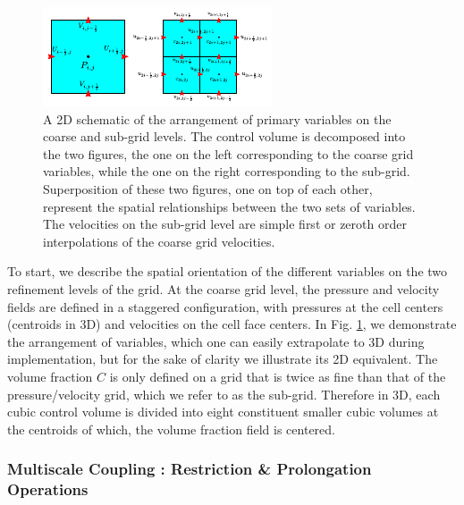 \begin{figure}[h!]
\includegraphics[width = \textwidth]{plots/sub_grid.pdf} 
\centering
\caption{A 2D schematic of the arrangement of primary variables 
on the coarse and sub-grid levels. 
The control volume is decomposed into the two figures, the one
on the left corresponding to the coarse grid variables, while the 
one on the right corresponding to the sub-grid. 
Superposition of these two figures, one on top of each other,
represent the spatial relationships between the two sets of variables.
The velocities on the sub-grid level are simple first 
or zeroth order interpolations of the coarse grid velocities.
}
\label{sub_grid}
\end{figure}

To start, we describe the spatial orientation of the different 
variables on the two refinement levels of the grid.   
At the coarse grid level, the pressure and velocity fields are 
defined in a staggered configuration, with pressures at the cell 
centers (centroids in 3D) and velocities on the cell face centers. 
In Fig. \ref{sub_grid}, we demonstrate the arrangement of variables, 
which one can easily extrapolate to 3D during implementation, 
but for the sake of clarity we illustrate its 2D equivalent. 
The volume fraction $C$ 
 is only defined on a grid that is twice as fine than 
that of the pressure/velocity grid, which we refer to as the sub-grid. 
Therefore in 3D, each cubic control volume is divided into eight constituent 
smaller cubic volumes at the centroids of which, the volume fraction field is centered. 


\subsubsection*{Multiscale Coupling : Restriction \& Prolongation Operations}

